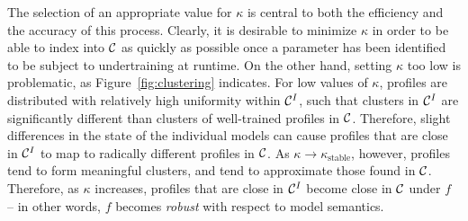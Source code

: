 The selection of an appropriate value for $\kappa$ is central to both
the efficiency and the accuracy of this process.  Clearly, it is
desirable to minimize $\kappa$ in order to be able to index into $\mathcal{C}$
as quickly as possible once a parameter has been identified to be
subject to undertraining at runtime.  On the other hand, setting
$\kappa$ too low is problematic, as Figure~\ref{fig:clustering}
indicates.  For low values of $\kappa$, profiles are distributed with
relatively high uniformity within $\mathcal{C}^I$, such that clusters in
$\mathcal{C}^I$ are significantly different than clusters of well-trained
profiles in $\mathcal{C}$.  Therefore, slight differences in the state of the
individual models can cause profiles that are close in $\mathcal{C}^I$ to map
to radically different profiles in $\mathcal{C}$.  As
$\kappa\rightarrow\kappa_{\text{stable}}$, however, profiles tend to
form meaningful clusters, and tend to approximate those found in
$\mathcal{C}$.  Therefore, as $\kappa$ increases, profiles that are close in
$\mathcal{C}^I$ become close in $\mathcal{C}$ under $f$ -- in other words, $f$ becomes
\emph{robust} with respect to model semantics.

